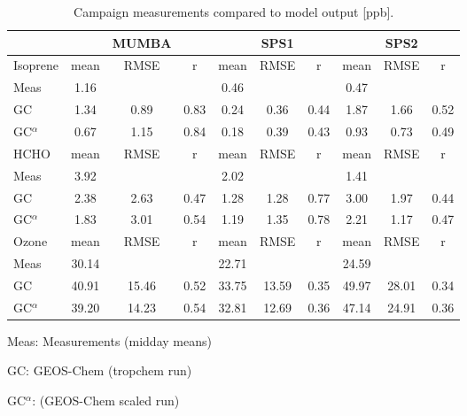     
    \begin{table}\begin{threeparttable}
      \caption{Campaign measurements compared to model output [ppb].}
      \begin{tabular}{ l | c c c | c c c | c c c } 
        \toprule
        & & MUMBA & & & SPS1 & & & SPS2 & \\
        \midrule
        Isoprene   & mean & RMSE & r   & mean & RMSE & r   & mean & RMSE & r   \\
        Meas            &  1.16 &     &     &  0.46 &     &     &  0.47 &     &     \\
        GC              &  1.34 &  0.89 &  0.83 &  0.24 &  0.36 &  0.44 &  1.87 &  1.66 & 0.52  \\
        GC$^{\alpha}$         &  0.67 &  1.15 &  0.84 &  0.18 &  0.39 &  0.43 &  0.93 &  0.73 & 0.49  \\
        \midrule
        HCHO       & mean & RMSE & r   & mean & RMSE & r   & mean & RMSE & r   \\
        Meas            &  3.92 &     &     &  2.02 &     &     &  1.41 &     &     \\
        GC              &  2.38 &  2.63 &  0.47 &  1.28 &  1.28 &  0.77 &  3.00 &  1.97 & 0.44  \\
        GC$^{\alpha}$         &  1.83 &  3.01 &  0.54 &  1.19 &  1.35 &  0.78 &  2.21 &  1.17 & 0.47  \\
        \midrule
        Ozone      & mean & RMSE & r   & mean & RMSE & r   & mean & RMSE & r   \\
        Meas            & 30.14 &     &     & 22.71 &     &     & 24.59 &     &     \\
        GC              & 40.91 & 15.46 &  0.52 & 33.75 & 13.59 &  0.35 & 49.97 & 28.01 & 0.34  \\
        GC$^{\alpha}$         & 39.20 & 14.23 &  0.54 & 32.81 & 12.69 &  0.36 & 47.14 & 24.91 & 0.36  \\
        
        \bottomrule
      \end{tabular}
      \begin{tablenotes} 
        \item Meas: Measurements (midday means)
        \item GC: GEOS-Chem (tropchem run)
        \item GC$^{\alpha}$: (GEOS-Chem scaled run)
      \end{tablenotes}
      \label{BioIsop:results:measurements:tab_campaign_comparison}
    \end{threeparttable}\end{table}
    
